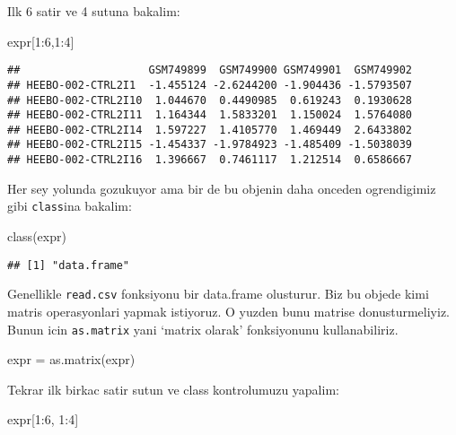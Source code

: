 \documentclass[
]{book}
\newenvironment{Shaded}{\begin{snugshade}}{\end{snugshade}}
\newcommand{\DecValTok}[1]{\textcolor[rgb]{0.00,0.00,0.81}{#1}}
\newcommand{\FunctionTok}[1]{\textcolor[rgb]{0.00,0.00,0.00}{#1}}
\newcommand{\NormalTok}[1]{#1}
\newcommand{\OtherTok}[1]{\textcolor[rgb]{0.56,0.35,0.01}{#1}}
\newcommand{\SpecialCharTok}[1]{\textcolor[rgb]{0.00,0.00,0.00}{#1}}
\begin{document}
Ilk 6 satir ve 4 sutuna bakalim:

\begin{Shaded}
\begin{Highlighting}[]
\NormalTok{expr[}\DecValTok{1}\SpecialCharTok{:}\DecValTok{6}\NormalTok{,}\DecValTok{1}\SpecialCharTok{:}\DecValTok{4}\NormalTok{]}
\end{Highlighting}
\end{Shaded}

\begin{verbatim}
##                    GSM749899  GSM749900 GSM749901  GSM749902
## HEEBO-002-CTRL2I1  -1.455124 -2.6244200 -1.904436 -1.5793507
## HEEBO-002-CTRL2I10  1.044670  0.4490985  0.619243  0.1930628
## HEEBO-002-CTRL2I11  1.164344  1.5833201  1.150024  1.5764080
## HEEBO-002-CTRL2I14  1.597227  1.4105770  1.469449  2.6433802
## HEEBO-002-CTRL2I15 -1.454337 -1.9784923 -1.485409 -1.5038039
## HEEBO-002-CTRL2I16  1.396667  0.7461117  1.212514  0.6586667
\end{verbatim}

Her sey yolunda gozukuyor ama bir de bu objenin daha onceden ogrendigimiz gibi \texttt{class}ina bakalim:

\begin{Shaded}
\begin{Highlighting}[]
\FunctionTok{class}\NormalTok{(expr)}
\end{Highlighting}
\end{Shaded}

\begin{verbatim}
## [1] "data.frame"
\end{verbatim}

Genellikle \texttt{read.csv} fonksiyonu bir data.frame olusturur. Biz bu objede kimi matris operasyonlari yapmak istiyoruz. O yuzden bunu matrise donusturmeliyiz. Bunun icin \texttt{as.matrix} yani `matrix olarak' fonksiyonunu kullanabiliriz.

\begin{Shaded}
\begin{Highlighting}[]
\NormalTok{expr }\OtherTok{=} \FunctionTok{as.matrix}\NormalTok{(expr)}
\end{Highlighting}
\end{Shaded}

Tekrar ilk birkac satir sutun ve class kontrolumuzu yapalim:

\begin{Shaded}
\begin{Highlighting}[]
\NormalTok{expr[}\DecValTok{1}\SpecialCharTok{:}\DecValTok{6}\NormalTok{, }\DecValTok{1}\SpecialCharTok{:}\DecValTok{4}\NormalTok{]}
\end{Highlighting}
\end{Shaded}
\end{document}
